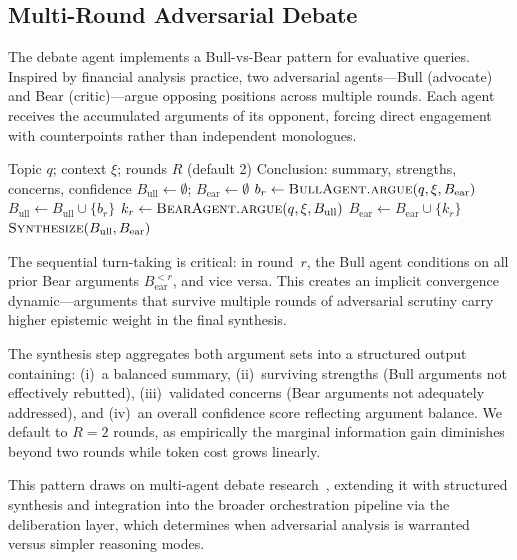 \documentclass{article}
\theoremstyle{plain}
\theoremstyle{definition}
\begin{document}
\subsection{Multi-Round Adversarial Debate}\label{sec:debate_algo}

The debate agent implements a Bull-vs-Bear pattern for evaluative queries.
Inspired by financial analysis practice, two adversarial agents---Bull
(advocate) and Bear (critic)---argue opposing positions across multiple rounds.
Each agent receives the accumulated arguments of its opponent, forcing direct
engagement with counterpoints rather than independent monologues.

\begin{algorithm}[ht!]
\caption{Multi-Round Adversarial Debate}
\label{alg:debate}
\begin{algorithmic}
\REQUIRE Topic $q$; context $\xi$; rounds $R$ (default 2)
\ENSURE Conclusion: summary, strengths, concerns, confidence
\STATE $B_\mathrm{ull} \leftarrow \emptyset$; $B_\mathrm{ear} \leftarrow \emptyset$
  \STATE $b_r \leftarrow \textsc{BullAgent.argue}(q, \xi, B_\mathrm{ear})$
  \STATE $B_\mathrm{ull} \leftarrow B_\mathrm{ull} \cup \{b_r\}$
  \STATE $k_r \leftarrow \textsc{BearAgent.argue}(q, \xi, B_\mathrm{ull})$
  \STATE $B_\mathrm{ear} \leftarrow B_\mathrm{ear} \cup \{k_r\}$
\ENDFOR
\RETURN $\textsc{Synthesize}(B_\mathrm{ull}, B_\mathrm{ear})$
\end{algorithmic}
\end{algorithm}

The sequential turn-taking is critical: in round~$r$, the Bull agent conditions
on all prior Bear arguments $B_\mathrm{ear}^{<r}$, and vice versa.  This
creates an implicit convergence dynamic---arguments that survive multiple rounds
of adversarial scrutiny carry higher epistemic weight in the final synthesis.

The synthesis step aggregates both argument sets into a structured output
containing: (i)~a balanced summary, (ii)~surviving strengths (Bull arguments not
effectively rebutted), (iii)~validated concerns (Bear arguments not adequately
addressed), and (iv)~an overall confidence score reflecting argument balance.
We default to $R{=}2$ rounds, as empirically the marginal information gain
diminishes beyond two rounds while token cost grows linearly.

This pattern draws on multi-agent debate
research~\citep{du2023debate,liang2023debate}, extending it with structured
synthesis and integration into the broader orchestration pipeline via the
deliberation layer, which determines when adversarial analysis is warranted
versus simpler reasoning modes.
\end{document}
